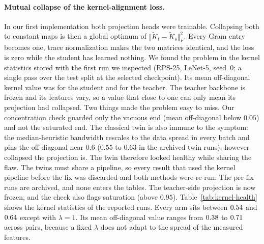 \paragraph{Mutual collapse of the kernel-alignment loss.}
In our first implementation both projection heads were trainable.
Collapsing both to constant maps is then a global optimum of $\Vert\tilde K_t-\tilde K_s\Vert_F^2$. Every Gram entry becomes one, trace normalization makes the two matrices identical, and the loss is zero while the student has learned nothing.
We found the problem in the kernel statistics stored with the first \Pqk run we inspected (RPS-25, LeNet-5, seed~0; a single pass over the test split at the selected checkpoint). Its mean off-diagonal kernel value was \CollapseStudent{} for the student and \CollapseTeacher{} for the teacher. The teacher backbone is frozen and its features vary, so a value that close to one can only mean its projection had collapsed.
Two things made the problem easy to miss.
Our concentration check guarded only the vacuous end (mean off-diagonal below $0.05$) and not the saturated end. The classical twin is also immune to the symptom: the median-heuristic bandwidth rescales to the data spread in every batch and pins the off-diagonal near $0.6$ ($0.55$ to $0.63$ in the archived twin runs), however collapsed the projection is.
The twin therefore looked healthy while sharing the flaw.
The twins must share a pipeline, so every result that used the kernel pipeline before the fix was discarded and both methods were re-run. The pre-fix runs are archived, and none enters the tables.
The teacher-side projection is now frozen, and the check also flags saturation (above $0.95$).
Table~\ref{tab:kernel-health} shows the kernel statistics of the reported runs. Every arm sits between $0.54{}$ and $0.64{}$ except \Pqk with $\lambda=1$. Its mean off-diagonal value ranges from $0.38{}$ to $0.71{}$ across pairs, because a fixed $\lambda$ does not adapt to the spread of the measured features.

\begin{table}[t]
  \centering
  \caption{Mean off-diagonal kernel value $K_{ij}$ of the student and the teacher Gram matrices, from a single pass over the test split at the selected checkpoint (averaged over its batches, at $\gamma_{\max}$), summarized over the runs of each method.}
  \label{tab:kernel-health}
\end{table}

